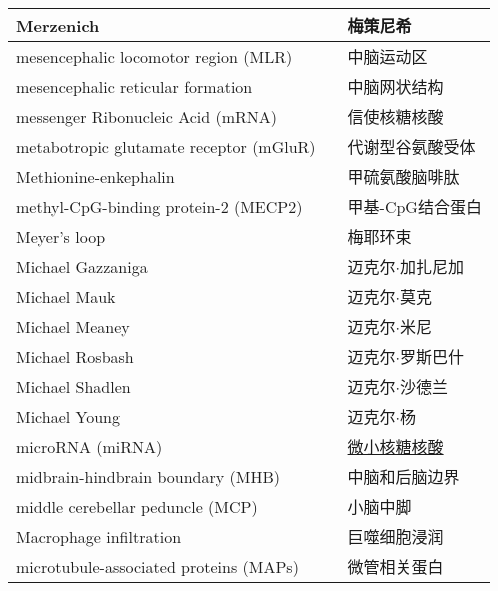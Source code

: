 \begin{longtable}{lll}
	\midrule
	Merzenich && 梅策尼希  \\
	
	\midrule
	mesencephalic locomotor region (MLR)   && 中脑运动区  \\
	
	\midrule
	mesencephalic reticular formation   && 中脑网状结构  \\
	
	\midrule
	messenger Ribonucleic Acid (mRNA)   && 信使核糖核酸  \\
	
	\midrule
	metabotropic glutamate receptor (mGluR)  && 代谢型谷氨酸受体  \\
	
	\midrule
	Methionine-enkephalin   && 甲硫氨酸脑啡肽  \\
	
	\midrule
	methyl-CpG-binding protein-2 (MECP2)  && 甲基-CpG结合蛋白  \\
	
	\midrule
	Meyer's loop  && 梅耶环束 \\
	
	\midrule
	Michael Gazzaniga   && 迈克尔$\cdot$加扎尼加  \\
	
	\midrule
	Michael Mauk   && 迈克尔$\cdot$莫克  \\
	
	\midrule
	Michael Meaney   && 迈克尔$\cdot$米尼  \\
	
	\midrule
	Michael Rosbash   && 迈克尔$\cdot$罗斯巴什  \\
	
	\midrule
	Michael Shadlen   && 迈克尔$\cdot$沙德兰  \\
	
	\midrule
	Michael Young   && 迈克尔$\cdot$杨  \\
	
	\midrule
	microRNA (miRNA)   && \href{https://baike.baidu.com/item/micro\%20RNA/3683223}{微小核糖核酸}  \\
	
	\midrule
	midbrain-hindbrain boundary (MHB) && 中脑和后脑边界  \\
	
	\midrule
	middle cerebellar peduncle (MCP)  && 小脑中脚  \\
	
	\midrule
	Macrophage infiltration   && 巨噬细胞浸润  \\
	
	\midrule
	microtubule-associated proteins (MAPs)  && 微管相关蛋白  \\
	

\end{longtable}
